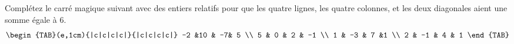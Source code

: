 \documentclass[14pt]{extreport}
\theoremstyle{plain}
\begin{document}
Complétez le carré magique suivant avec des entiers relatifs pour que les quatre lignes, les quatre colonnes, 
et les deux diagonales aient une somme égale à $6$. 
%
\[
\begin{TAB}(e,1cm){|c|c|c|c|}{|c|c|c|c|}
    -2 &10 & -7& 5 \\
    5 & 0 & 2 & -1 \\
     1 & -3 & 7 &1 \\
     2 & -1 & 4 & 1
\end{TAB}
\]
 
\end{document}
